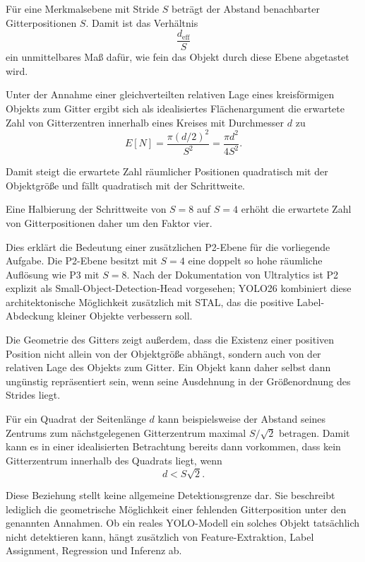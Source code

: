 Für eine Merkmalsebene mit Stride $S$ beträgt der Abstand benachbarter Gitterpositionen $S$. Damit ist das Verhältnis
\begin{equation}
\frac{d_{\mathrm{eff}}}{S}
\tag{3.9}
\end{equation}
ein unmittelbares Maß dafür, wie fein das Objekt durch diese Ebene abgetastet wird.

Unter der Annahme einer gleichverteilten relativen Lage eines kreisförmigen Objekts zum Gitter ergibt sich als idealisiertes Flächenargument die erwartete Zahl von Gitterzentren innerhalb eines Kreises mit Durchmesser $d$ zu
\begin{equation}
E[N]
=
\frac{\pi(d/2)^2}{S^2}
=
\frac{\pi d^2}{4S^2}.
\tag{3.10}
\end{equation}

Damit steigt die erwartete Zahl räumlicher Positionen quadratisch mit der Objektgröße und fällt quadratisch mit der Schrittweite.

Eine Halbierung der Schrittweite von $S=8$ auf $S=4$ erhöht die erwartete Zahl von Gitterpositionen daher um den Faktor vier.

Dies erklärt die Bedeutung einer zusätzlichen P2-Ebene für die vorliegende Aufgabe. Die P2-Ebene besitzt mit $S=4$ eine doppelt so hohe räumliche Auflösung wie P3 mit $S=8$. Nach der Dokumentation von Ultralytics ist P2 explizit als Small-Object-Detection-Head vorgesehen; YOLO26 kombiniert diese architektonische Möglichkeit zusätzlich mit STAL, das die positive Label-Abdeckung kleiner Objekte verbessern soll.

Die Geometrie des Gitters zeigt außerdem, dass die Existenz einer positiven Position nicht allein von der Objektgröße abhängt, sondern auch von der relativen Lage des Objekts zum Gitter. Ein Objekt kann daher selbst dann ungünstig repräsentiert sein, wenn seine Ausdehnung in der Größenordnung des Strides liegt.

Für ein Quadrat der Seitenlänge $d$ kann beispielsweise der Abstand seines Zentrums zum nächstgelegenen Gitterzentrum maximal $S/\sqrt{2}$ betragen. Damit kann es in einer idealisierten Betrachtung bereits dann vorkommen, dass kein Gitterzentrum innerhalb des Quadrats liegt, wenn
\begin{equation}
d<S\sqrt{2}.
\tag{3.11}
\end{equation}

Diese Beziehung stellt keine allgemeine Detektionsgrenze dar. Sie beschreibt lediglich die geometrische Möglichkeit einer fehlenden Gitterposition unter den genannten Annahmen. Ob ein reales YOLO-Modell ein solches Objekt tatsächlich nicht detektieren kann, hängt zusätzlich von Feature-Extraktion, Label Assignment, Regression und Inferenz ab.

